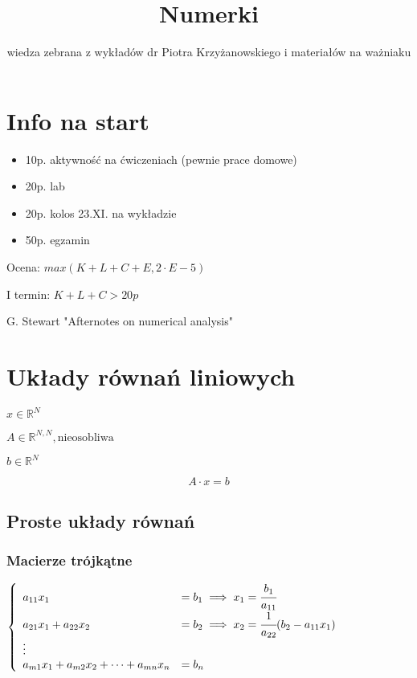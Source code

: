 \documentclass[hidelinks,a4paper,fleqn]{article}
\author{wiedza zebrana z wykładów dr Piotra Krzyżanowskiego i materiałów na ważniaku}
\title{Numerki}
\newcommand{\RR}{\mathbb{R}}
\begin{document}
\linespread{1.0}
\maketitle

\tableofcontents

\clearpage

\section*{Info na start}

\begin{itemize}
	\item 10p. aktywność na ćwiczeniach (pewnie prace domowe)
	\item 20p. lab
	\item 20p. kolos 23.XI. na wykładzie
	\item 50p. egzamin
\end{itemize}

Ocena: $max(K + L + C + E, 2 \cdot E - 5)$

I termin: $K + L + C > 20p$

G. Stewart "Afternotes on numerical analysis"

\section{Układy równań liniowych}

$x \in \RR^N$

$A \in \RR^{N,N}, \textrm{nieosobliwa}$

$b \in \RR^N$

\[
	A \cdot x = b
\]

\subsection{Proste układy równań}

\subsubsection{Macierze trójkątne}

$
\left\{
\begin{array}{ll}
	a_{11}x_1                                  & = b_1 \implies x_1 = \cfrac{b_1}{a_{11}}                \\
	a_{21}x_1 + a_{22}x_2                      & = b_2 \implies x_2 = \cfrac{1}{a_{22}}(b_2 - a_{11}x_1) \\
	\vdots \\
	a_{m1}x_1 + a_{m2}x_2 + \cdots + a_{mn}x_n & = b_n                                                   
\end{array}
\right.
$
\end{document}
